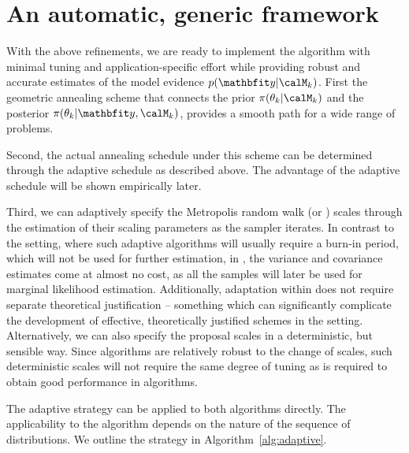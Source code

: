 \section{An automatic, generic framework}
\label{sec:An automatic, generic framework}

With the above refinements, we are ready to implement the \smc[2] algorithm
with minimal tuning and application-specific effort while providing robust and
accurate estimates of the model evidence $p(\data|\Mk)$. First the geometric
annealing scheme that connects the prior $\pi(\paramk|\Mk)$ and the posterior
$\pi(\paramk|\data,\Mk)$, provides a smooth path for a wide range of problems.

Second, the actual annealing schedule under this scheme can be determined
through the adaptive schedule as described above. The advantage of the
adaptive schedule will be shown empirically later.

Third, we can adaptively specify the Metropolis random walk (or \mala) scales
through the estimation of their scaling parameters as the sampler iterates. In
contrast to the \mcmc setting, where such adaptive algorithms will usually
require a burn-in period, which will not be used for further estimation, in
\smc, the variance and covariance estimates come at almost no cost, as all the
samples will later be used for marginal likelihood estimation. Additionally,
adaptation within \smc does not require separate theoretical justification --
something which can significantly complicate the development of effective,
theoretically justified schemes in the \mcmc setting. Alternatively, we can
also specify the proposal scales in a deterministic, but sensible way. Since
\smc algorithms are relatively robust to the change of scales, such
deterministic scales will not require the same degree of tuning as is required
to obtain good performance in \mcmc algorithms.

The adaptive strategy can be applied to both algorithms directly. The
applicability to the \smc[3] algorithm depends on the nature of the sequence
of distributions. We outline the strategy in Algorithm~\ref{alg:adaptive}.

